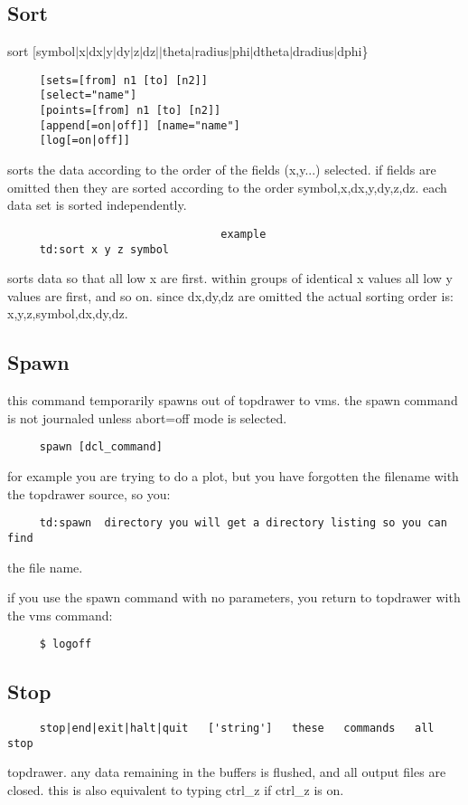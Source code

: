\subsection{Sort}
sort [symbol$|$x$|$dx$|$y$|$dy$|$z$|$dz$|$$|$theta$|$radius$|$phi$|$dtheta$|$dradius$|$dphi\} 
\begin{verbatim}
     [sets=[from] n1 [to] [n2]] 
     [select="name"] 
     [points=[from] n1 [to] [n2]] 
     [append[=on|off]] [name="name"] 
     [log[=on|off]] 
\end{verbatim}
sorts  the  data  according to the order of the fields (x,y...) selected.
if fields are omitted  then  they  are  sorted  according  to  the  order
symbol,x,dx,y,dy,z,dz.  each data set is sorted independently.  

\begin{verbatim}
                                 example
     td:sort x y z symbol 
\end{verbatim}
sorts  data  so  that  all low x are first.  within groups of identical x
values all low y values are first, and so on.  since dx,dy,dz are omitted
the actual sorting order is:  x,y,z,symbol,dx,dy,dz.  
\subsection{Spawn}
this  command  temporarily  spawns  out  of  topdrawer to vms.  the spawn
command is not journaled unless abort=off mode is selected.  
\begin{verbatim}
     spawn [dcl_command] 
\end{verbatim}

for  example  you  are  trying  to  do a plot, but you have forgotten the
filename with the topdrawer source, so you:  
\begin{verbatim}
     td:spawn  directory you will get a directory listing so you can find
\end{verbatim}
the file name.  

if  you use the spawn command with no parameters, you return to topdrawer
with the vms command:  
\begin{verbatim}
     $ logoff 
\end{verbatim}
\subsection{Stop}
\begin{verbatim}
     stop|end|exit|halt|quit   ['string']   these   commands   all   stop
\end{verbatim}
topdrawer.  any data remaining in the buffers is flushed, and all  output
files are closed.  
this is also equivalent to typing ctrl\_z if ctrl\_z is on.  

